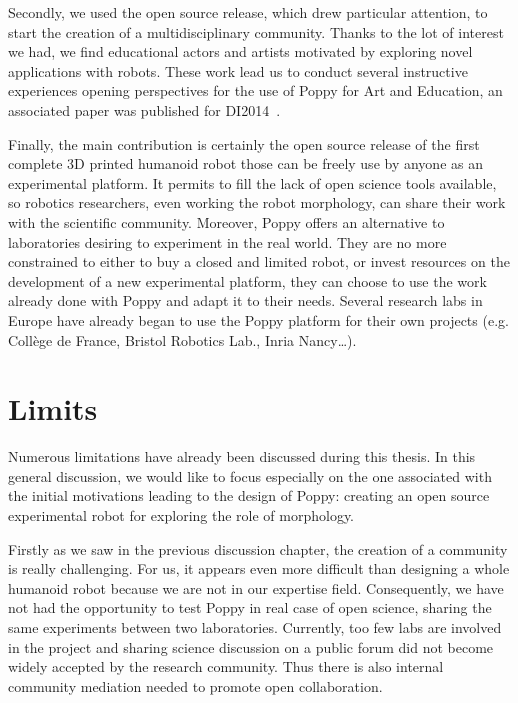 Secondly, we used the open source release, which drew particular attention, to start the creation of a multidisciplinary community. Thanks to the lot of interest we had, we find educational actors and artists motivated by exploring novel applications with robots. These work lead us to conduct several instructive experiences opening perspectives for the use of Poppy for Art and Education, an associated paper was published for DI2014~\parencite{REF}.

Finally, the main contribution is certainly the open source release of the first complete 3D printed humanoid robot those can be freely use by anyone as an experimental platform. It permits to fill the lack of open science tools available, so robotics researchers, even working the robot morphology, can share their work with the scientific community. Moreover, Poppy offers an alternative to laboratories desiring to experiment in the real world. They are no more constrained to either to buy a closed and limited robot, or invest resources on the development of a new experimental platform, they can choose to use the work already done with Poppy and adapt it to their needs.
Several research labs in Europe have already began to use the Poppy platform for their own projects (e.g. Collège de France, Bristol Robotics Lab., Inria Nancy…).



\section{Limits} %

Numerous limitations have already been discussed during this thesis. In this general discussion, we would like to focus especially on the one associated with the initial motivations leading to the design of Poppy: creating an open source experimental robot for exploring the role of morphology.

Firstly as we saw in the previous discussion chapter, the creation of a community is really challenging. For us, it appears even more difficult than designing a whole humanoid robot because we are not in our expertise field.
Consequently, we have not had the opportunity to test Poppy in real case of open science, sharing the same experiments between two laboratories. Currently, too few labs are involved in the project and sharing science discussion on a public forum did not become widely accepted by the research community. Thus there is also internal community mediation needed to promote open collaboration.

